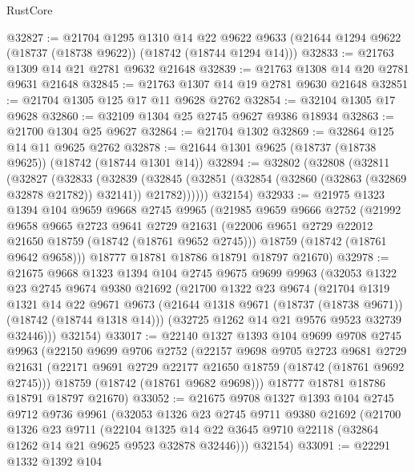 \begin{lexlean}{RustCore}
\begin{coremodule}
@32827 := @21704
    @1295
    @1310
    @14
    @22
    @9622
    @9633
    (@21644 @1294 @9622 (@18737 (@18738 @9622)) (@18742 (@18744 @1294 @14)))
@32833 := @21763 @1309 @14 @21 @2781 @9632 @21648
@32839 := @21763 @1308 @14 @20 @2781 @9631 @21648
@32845 := @21763 @1307 @14 @19 @2781 @9630 @21648
@32851 := @21704 @1305 @125 @17 @11 @9628 @2762
@32854 := @32104 @1305 @17 @9628
@32860 := @32109 @1304 @25 @2745 @9627 @9386 @18934
@32863 := @21700 @1304 @25 @9627
@32864 := @21704 @1302
@32869 := @32864 @125 @14 @11 @9625 @2762
@32878 := @21644 @1301 @9625 (@18737 (@18738 @9625)) (@18742 (@18744 @1301 @14))
@32894 := @32802
    (@32808
      (@32811
        (@32827
          (@32833
            (@32839
              (@32845 (@32851 (@32854 (@32860 (@32863 (@32869 @32878 @21782)) @32141)) @21782))))))
      @32154)
@32933 := @21975
    @1323
    @1394
    @104
    @9659
    @9668
    @2745
    @9965
    (@21985
      @9659
      @9666
      @2752
      (@21992
        @9658
        @9665
        @2723
        @9641
        @2729
        @21631
        (@22006 @9651 @2729 @22012 @21650 @18759 (@18742 (@18761 @9652 @2745)))
        @18759
        (@18742 (@18761 @9642 @9658)))
      @18777
      @18781
      @18786
      @18791
      @18797
      @21670)
@32978 := @21675
    @9668
    @1323
    @1394
    @104
    @2745
    @9675
    @9699
    @9963
    (@32053
      @1322
      @23
      @2745
      @9674
      @9380
      @21692
      (@21700
        @1322
        @23
        @9674
        (@21704
          @1319
          @1321
          @14
          @22
          @9671
          @9673
          (@21644 @1318 @9671 (@18737 (@18738 @9671)) (@18742 (@18744 @1318 @14)))
          (@32725 @1262 @14 @21 @9576 @9523 @32739 @32446)))
      @32154)
@33017 := @22140
    @1327
    @1393
    @104
    @9699
    @9708
    @2745
    @9963
    (@22150
      @9699
      @9706
      @2752
      (@22157
        @9698
        @9705
        @2723
        @9681
        @2729
        @21631
        (@22171 @9691 @2729 @22177 @21650 @18759 (@18742 (@18761 @9692 @2745)))
        @18759
        (@18742 (@18761 @9682 @9698)))
      @18777
      @18781
      @18786
      @18791
      @18797
      @21670)
@33052 := @21675
    @9708
    @1327
    @1393
    @104
    @2745
    @9712
    @9736
    @9961
    (@32053
      @1326
      @23
      @2745
      @9711
      @9380
      @21692
      (@21700
        @1326
        @23
        @9711
        (@22104 @1325 @14 @22 @3645 @9710 @22118 (@32864 @1262 @14 @21 @9625 @9523 @32878 @32446)))
      @32154)
@33091 := @22291
    @1332
    @1392
    @104

\end{coremodule}
\end{lexlean}
